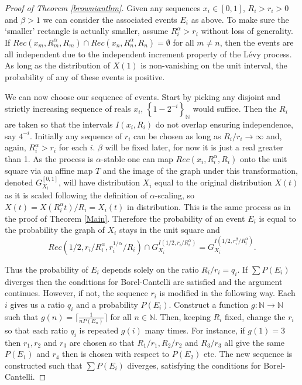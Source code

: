 \begin{proof}[Proof of Theorem \ref{brownianthm}]
Given any sequences $x_i \in [0,1]$, $R_i > r_i > 0$ and $\beta > 1$ we can consider the associated events $E_i$ as above. To make sure the `smaller' rectangle is actually smaller, assume $R_i^{\alpha} > r_i$ without loss of generality. If $Rec(x_m,R_m^{\alpha}, R_m) \cap Rec(x_n,R_n^{\alpha},R_n) = \emptyset$ for all $m\neq n$, then the events are all independent due to the independent increment property of the L\'evy process. As long as the distribution of $X(1)$ is non-vanishing on the unit interval, the probability of any of these events is positive.

We can now choose our sequence of events. Start by picking any disjoint and strictly increasing sequence of reals  $x_i$, $\left\{1-2^{-i} \right\}_{\mathbb{N}}$ would suffice. Then the $R_i$ are taken so that the intervals $I(x_i, R_i)$ do not overlap ensuring independence, say $4^{-i}$. Initially any sequence of $r_i$ can be chosen as long as $R_i/r_i \rightarrow \infty$ and, again, $R_i^{\alpha} > r_i$ for each $i$. $\beta$ will be fixed later, for now it is just a real greater than 1. As the process is $\alpha$-stable one can map $Rec(x_i,R_i^{\alpha},R_i)$ onto the unit square via an affine map $T$ and the image of the graph under this transformation, denoted $G_{X_i}^{[0,1]}$, will have distribution $X_i$ equal to the original distribution $X(t)$ as it is scaled following the definition of $\alpha$-scaling, so $X(t) = X(R_i^\alpha t)/R_i = X_i(t)$ in distribution. This is the same process as in the proof of Theorem \ref{Main}. Therefore the probability of an event $E_i$ is equal to the probability the graph of $X_i$ stays in the unit square and 
$$Rec(1/2,r_i/R_i^{\alpha} ,r_i^{1/\alpha}/R_i ) \cap G_{X_i}^{I(1/2, r_i/R_i^{\alpha})} = G_{X_i}^{I(1/2, r_i^{\beta}/R_i^{\alpha})}.$$

Thus the probability of $E_i$ depends solely on the ratio $R_i/r_i = q_i$. If $\sum P(E_i)$ diverges then the conditions for Borel-Cantelli are satisfied and the argument continues. However, if not, the sequence $r_i$ is modified in the following way. Each $i$ gives us a ratio $q_i$ and a probability $P(E_i)$. Construct a function $g \colon \mathbb{N} \rightarrow \mathbb{N}$ such that $g(n) = \lceil \frac{1}{nP(E_n)}\rceil$ for all $n\in \mathbb{N}$. Then, keeping $R_i$ fixed, change the $r_i$ so that each ratio $q_i$ is repeated $g(i)$ many times. For instance, if $g(1) = 3$ then $r_1,r_2$ and $r_3$ are chosen so that $R_1/r_1, R_2/r_2$ and $R_3/r_3$ all give the same $P(E_1)$ and $r_4$ then is chosen with respect to $P(E_2)$ etc. The new sequence is constructed such that $\sum P(E_i)$ diverges, satisfying the conditions for Borel-Cantelli.


\end{proof}
